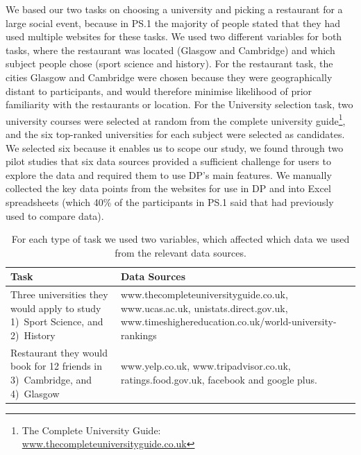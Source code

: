 \documentclass{sigchi}
\begin{document}
We based our two tasks on choosing a university and picking a restaurant for a large social event, because in PS.1 the majority of people stated that they had used multiple websites for these tasks.  We used two different variables for both tasks, where the restaurant was located (Glasgow and Cambridge) and which subject people chose (sport science and history).  For the restaurant task, the cities Glasgow and Cambridge were chosen because they were geographically distant to participants, and would therefore minimise likelihood of prior familiarity with the restaurants or location.  For the University selection task, two university courses were selected at random from the complete university guide\footnote{The Complete University Guide:\\\url{www.thecompleteuniversityguide.co.uk}}, and the six top-ranked universities for each subject were selected as candidates.  
We selected six because it enables us to scope our study, we found through two pilot studies that six data sources provided a sufficient challenge for users to explore the data and required them to use DP's main features. We manually collected the key data points from the websites for use in DP and into Excel spreadsheets (which 40\% of the participants in PS.1 said that had previously used to compare data).

\begin{table}[htbp]
\begin{center}
\small
\begin{tabular}{|p{3cm}|p{4.7cm}|}
\hline
Task	 & Data Sources\\
\hline
Three universities they would apply to study 1)~Sport Science, and 2)~History & www.thecompleteuniversityguide.co.uk, www.ucas.ac.uk, unistats.direct.gov.uk, www.timeshighereducation.co.uk/world-university-rankings\\
\hline
Restaurant they would book for 12 friends in 3)~Cambridge, and 4)~Glasgow & www.yelp.co.uk, www.tripadvisor.co.uk, ratings.food.gov.uk, facebook and google plus.\\
\hline
\end{tabular}
\end{center}
\caption{For each type of task we used two variables, which affected which data we used from the relevant data sources.} \label{tab:studyfactors}
\normalsize
\end{table}
\end{document}
